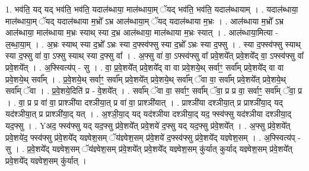 \documentclass[17pt]{extarticle}
\begin{document}
1. भव॑ति॒ यद् यद् भव॑ति॒ भव॑ति॒ यदाल॑ब्धाया॒ माल॑ब्धाया॒म् ॅयद् भव॑ति॒ भव॑ति॒ यदाल॑ब्धायाम् । . यदाल॑ब्धाया॒ माल॑ब्धाया॒म् ॅयद् यदाल॑ब्धाया म॒भ्रो᳚ ऽभ्र आल॑ब्धाया॒म् ॅयद् यदाल॑ब्धाया म॒भ्रः । . आल॑ब्धाया म॒भ्रो᳚ ऽभ्र आल॑ब्धाया॒ माल॑ब्धाया म॒भ्रः स्याथ् स्या द॒भ्र आल॑ब्धाया॒ माल॑ब्धाया म॒भ्रः स्यात् । . आल॑ब्धाया॒मित्या - ल॒ब्धा॒या॒म् । . अ॒भ्रः स्याथ् स्या द॒भ्रो᳚ ऽभ्रः स्या द॒फ्स्व॑फ्सु स्या द॒भ्रो᳚ ऽभ्रः स्या द॒फ्सु । . स्या द॒फ्स्व॑फ्सु स्याथ् स्या द॒फ्सु वा॑ वा॒ ऽफ्सु स्याथ् स्या द॒फ्सु वा᳚ । . अ॒फ्सु वा॑ वा॒ ऽफ्स्व॑फ्सु वा᳚ प्रवे॒शये᳚त् प्रवे॒शये᳚द् वा॒ ऽफ्स्व॑फ्सु वा᳚ प्रवे॒शये᳚त् । . अ॒फ्स्वित्य॑प् - सु । . वा॒ प्र॒वे॒शये᳚त् प्रवे॒शये᳚द् वा वा प्रवे॒शये॒थ् सर्वाꣳ॒॒ सर्वा᳚म् प्रवे॒शये᳚द् वा वा प्रवे॒शये॒थ् सर्वा᳚म् । . प्र॒वे॒शये॒थ् सर्वाꣳ॒॒ सर्वा᳚म् प्रवे॒शये᳚त् प्रवे॒शये॒थ् सर्वा᳚म् ॅवा वा॒ सर्वा᳚म् प्रवे॒शये᳚त् प्रवे॒शये॒थ् सर्वा᳚म् ॅवा । . प्र॒वे॒शये॒दिति॑ प्र - वे॒शये᳚त् । . सर्वा᳚म् ॅवा वा॒ सर्वाꣳ॒॒ सर्वा᳚म् ॅवा॒ प्र प्र वा॒ सर्वाꣳ॒॒ सर्वा᳚म् ॅवा॒ प्र । . वा॒ प्र प्र वा॑ वा॒ प्राश्ञी॑या दश्ञीया॒त् प्र वा॑ वा॒ प्राश्ञी॑यात् । . प्राश्ञी॑या दश्ञीया॒त् प्र प्राश्ञी॑या॒द् यद् यद॑श्ञीया॒त् प्र प्राश्ञी॑या॒द् यत् । . अ॒श्ञी॒या॒द् यद् यद॑श्ञीया दश्ञीया॒द् यद॒ फ्स्व॑फ्सु यद॑श्ञीया दश्ञीया॒द् यद॒फ्सु । . Yअद॒ फ्स्व॑फ्सु यद् यद॒फ्सु प्र॑वे॒शये᳚त् प्रवे॒शये॑ द॒फ्सु यद् यद॒फ्सु प्र॑वे॒शये᳚त् । . अ॒फ्सु प्र॑वे॒शये᳚त् प्रवे॒शये॑द॒ फ्स्व॑फ्सु प्र॑वे॒शये᳚द् यज्ञ्वेश॒सम् ॅय॑ज्ञ्वेश॒सम् प्र॑वे॒शये॑
द॒फ्स्व॑फ्सु प्र॑वे॒शये᳚द् यज्ञ्वेश॒सम् । . अ॒फ्स्वित्य॑प् - सु । . प्र॒वे॒शये᳚द् यज्ञ्वेश॒सम् ॅय॑ज्ञ्वेश॒सम् प्र॑वे॒शये᳚त् प्रवे॒शये᳚द् यज्ञ्वेश॒सम् कु॑र्यात् कुर्याद् यज्ञ्वेश॒सम् प्र॑वे॒शये᳚त् प्रवे॒शये᳚द् यज्ञ्वेश॒सम् कु॑र्यात् । \newline
\end{document}
